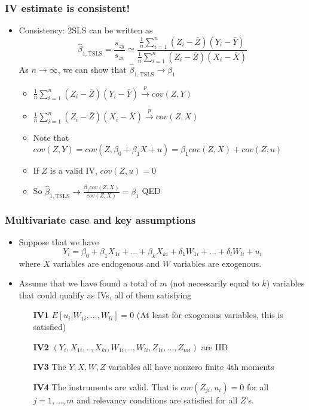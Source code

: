 \documentclass[aspectratio=169]{beamer}
\begin{document}
\begin{frame}
\frametitle{IV estimate is consistent!}
\begin{itemize}
\item Consistency: 2SLS can be written as
\[
\hat{\beta}_{1,\text{TSLS}}=\frac{s_{zy}}{s_{zx}}\simeq\frac{\frac{1}{n}\sum_{i=1}^n(Z_i-\bar{Z})(Y_i-\bar{Y})}{\frac{1}{n}\sum_{i=1}^n(Z_i-\bar{Z})(X_i-\bar{X})}
\]
As $n\to\infty$, we can show that $\hat{\beta}_{1,\text{TSLS}}\to\beta_1$
\begin{itemize}
\item $\frac{1}{n}\sum_{i=1}^n(Z_i-\bar{Z})(Y_i-\bar{Y}) \xrightarrow{p} cov(Z,Y)$
\item $\frac{1}{n}\sum_{i=1}^n(Z_i-\bar{Z})(X_i-\bar{X}) \xrightarrow{p} cov(Z,X)$
\item Note that $cov(Z,Y) = cov(Z,\beta_0+\beta_1X+u)=\beta_1 cov(Z,X) + cov(Z,u)$
\item If $Z$ is a valid IV, $ cov(Z,u)=0$
\item So $\hat{\beta}_{1,\text{TSLS}}\to\frac{\beta_1 cov(Z,X)}{cov(Z,X)} =\beta_1$ QED
\end{itemize}
\end{itemize}
\end{frame}

\begin{frame}
\frametitle{Multivariate case and key assumptions}
\begin{itemize}
\item Suppose that we have
\[
Y_i = \beta_0 + \beta_1X_{1i} +...+ \beta_kX_{ki} + \delta_1W_{1i}+...+\delta_lW_{li}+u_i 
\]
where $X$ variables are endogenous and $W$ variables are exogenous. 
\item Assume that we have found a total of $m$ (not necessarily equal to $k$) variables that could qualify as IVs, all of them satisfying 
\begin{itemize}
\item[\textbf{IV1}] $E[u_i|W_{1i},...,W_{li}]=0$ (At least for exogenous variables, this is satisfied)
\item[\textbf{IV2}] $(Y_i,X_{1i},..,X_{ki},W_{1i},..,W_{li},Z_{1i},...,Z_{mi})$ are IID
\item[\textbf{IV3}] The $Y,X,W,Z$ variables all have nonzero finite 4th moments
\item[\textbf{IV4}] The instruments are valid. That is $cov(Z_{ji},u_i)=0$ for all $j=1,...,m$ and relevancy conditions are satisfied for all $Z$'s. 
\end{itemize}
\end{itemize}
\end{frame}
\end{document}
